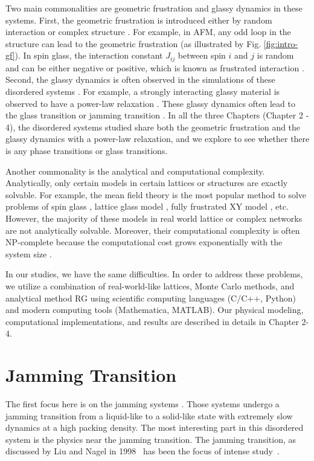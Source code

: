 Two main commonalities are geometric frustration and glassy dynamics  in these systems. First, the geometric frustration is introduced either by random interaction or complex structure \cite{vannimenus1977}. For example, in AFM, any odd loop in the structure can lead to the geometric frustration \cite{wannier1950afm} (as illustrated by Fig. \ref{fig:intro-gf}). In spin glass, the interaction constant $J_{ij}$ between spin $i$ and $j$ is random and can be either negative or positive, which is known as frustrated interaction \cite{edwards1975theory}.
Second, the glassy dynamics is often observed in the simulations of these disordered systems \cite{lunkenheimer2000}. For example, a strongly interacting glassy material is observed to have a power-law relaxation \cite{palmer1984}. These glassy dynamics often lead to the glass transition \cite{biroli2013perspective} or jamming transition \cite{Liu1998}. 
In all the three Chapters (Chapter 2 - 4), the disordered systems studied share both the geometric frustration and the glassy dynamics with a power-law relaxation, and we explore to see whether there is any phase transitions or glass transitions.

Another commonality is the analytical and computational complexity. Analytically, only certain models in certain lattices or structures are exactly solvable. For example, the mean field theory  \cite{kadanoff2009} is the most popular method to solve problems of spin glass \cite{sherrington1975}, lattice glass model \cite{Biroli02}, fully frustrated XY model \cite{kim2001xy}, etc. However, the majority of these models in real world lattice or complex networks are not analytically solvable. Moreover, their computational complexity is often NP-complete \cite{garey1983} because the computational cost grows exponentially with the system size \cite{barahona1982, weigt2000}.

In our studies, we have the same difficulties. In order to address these problems, we utilize a combination \cite{cheng2015jamming, ma2016prb} of real-world-like lattices, Monte Carlo methods, and analytical method RG using scientific computing languages (C/C++, Python) and modern computing tools (Mathematica, MATLAB). Our physical modeling, computational implementations, and results are described in details in Chapter 2-4.


\section{Jamming Transition}
\label{sec:jam_intro}
The first focus here is on the jamming systems \cite{Biroli2007}. Those systems undergo 
a jamming transition from a liquid-like to a solid-like state with extremely slow 
dynamics at a high packing density. The most interesting part in this 
disordered system is the physics near the jamming transition. 
The jamming transition, as discussed by Liu and
Nagel in 1998~\cite{Liu1998} has been the focus of
intense study~\cite{Biroli2007,Liu2010,Berthier2011}. 

